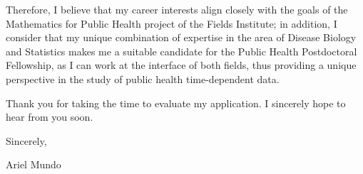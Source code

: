 \documentclass[
  11pt,
]{article}
\begin{document}
Therefore, I believe that my career interests align closely with the
goals of the Mathematics for Public Health project of the Fields
Institute; in addition, I consider that my unique combination of
expertise in the area of Disease Biology and Statistics makes me a
suitable candidate for the Public Health Postdoctoral Fellowship, as I
can work at the interface of both fields, thus providing a unique
perspective in the study of public health time-dependent data.

Thank you for taking the time to evaluate my application. I sincerely
hope to hear from you soon.

Sincerely,

Ariel Mundo
\end{document}
